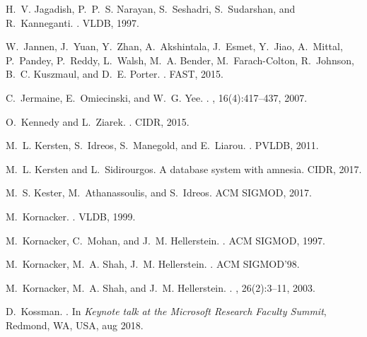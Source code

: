 \documentclass[11pt]{article}
\begin{document}
\begin{thebibliography}{10}
\begin{small}
H.~V. Jagadish, P.~P.~S. Narayan, S.~Seshadri, S.~Sudarshan, and R.~Kanneganti.
.
\newblock VLDB, 1997.

W.~Jannen, J.~Yuan, Y.~Zhan, A.~Akshintala, J.~Esmet, Y.~Jiao, A.~Mittal,
  P.~Pandey, P.~Reddy, L.~Walsh, M.~A. Bender, M.~Farach-Colton, R.~Johnson,
  B.~C. Kuszmaul, and D.~E. Porter.
.
\newblock FAST, 2015.

C.~Jermaine, E.~Omiecinski, and W.~G. Yee.
.
, 16(4):417--437, 2007.

O.~Kennedy and L.~Ziarek.
.
\newblock CIDR, 2015.

M.~L. Kersten, S.~Idreos, S.~Manegold, and E.~Liarou.
.
\newblock PVLDB, 2011.

M.~L. Kersten and L.~Sidirourgos.
\newblock A database system with amnesia.
\newblock CIDR, 2017.

M.~S. Kester, M.~Athanassoulis, and S.~Idreos.
\newblock ACM SIGMOD, 2017.

M.~Kornacker.
.
\newblock VLDB, 1999.

M.~Kornacker, C.~Mohan, and J.~M. Hellerstein.
.
\newblock ACM SIGMOD, 1997.

M.~Kornacker, M.~A. Shah, J.~M. Hellerstein.
.
\newblock ACM SIGMOD'98.

M.~Kornacker, M.~A. Shah, and J.~M. Hellerstein.
.
, 26(2):3--11, 2003.

D.~Kossman.
.
\newblock In {\em Keynote talk at the Microsoft Research Faculty Summit},
  Redmond, WA, USA, aug 2018.


\end{small}
\end{thebibliography}
\end{document}
